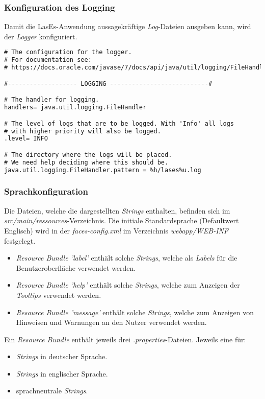 \subsubsection{Konfiguration des Logging}
Damit die LasEs-Anwendung aussagekräftige \emph{Log}-Dateien ausgeben kann,
wird der \emph{Logger} konfiguriert.

\begin{lstlisting}[language=XML, caption = Die Loggingkonfiguration \emph{logger.properties}]
# The configuration for the logger.
# For documentation see:
# https://docs.oracle.com/javase/7/docs/api/java/util/logging/FileHandler.html

#------------------- LOGGING ---------------------------#

# The handler for logging.
handlers= java.util.logging.FileHandler

# The level of logs that are to be logged. With 'Info' all logs
# with higher priority will also be logged.
.level= INFO

# The directory where the logs will be placed.
# We need help deciding where this should be.
java.util.logging.FileHandler.pattern = %h/lases%u.log
\end{lstlisting}

\subsubsection{Sprachkonfiguration}
Die Dateien, welche die dargestellten \emph{Strings} enthalten, befinden sich im
\emph{src/main/ressources}-Verzeichnis.
Die initiale Standardsprache (Defaultwert Englisch) wird in der \emph{faces-config.xml} im
Verzeichnis \emph{webapp/WEB-INF} festgelegt.

\begin{itemize}
    \item \emph{Resource Bundle 'label'} enthält solche \emph{Strings}, welche als \emph{Labels} für die Benutzeroberfläche verwendet
    werden.
    \item \emph{Resource Bundle 'help'} enthält solche \emph{Strings}, welche zum Anzeigen der \emph{Tooltips} verwendet
    werden.
    \item \emph{Resource Bundle 'message'} enthält solche \emph{Strings}, welche zum Anzeigen von Hinweisen und Warnungen
    an den Nutzer verwendet werden.
\end{itemize}

Ein \emph{Resource Bundle} enthält jeweils drei \emph{.properties}-Dateien.
Jeweils eine für:
\begin{itemize}
    \item \emph{Strings} in deutscher Sprache.
    \item \emph{Strings} in englischer Sprache.
    \item sprachneutrale \emph{Strings}.
\end{itemize}

